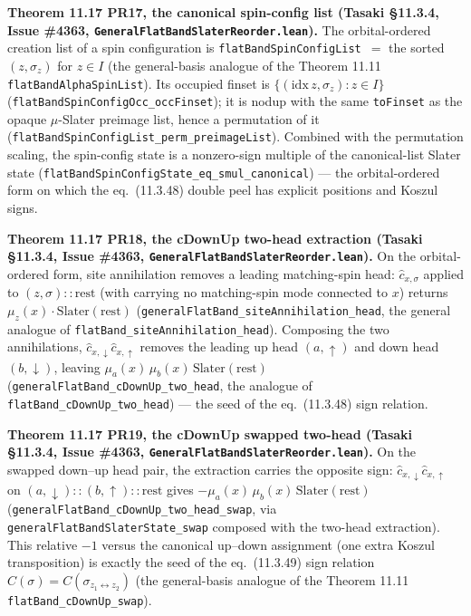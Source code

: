 \documentclass[a4paper,11pt]{article}
\begin{document}
\medskip\noindent\textbf{Theorem 11.17 PR17, the canonical spin-config list (Tasaki §11.3.4, Issue
\#4363, \texttt{GeneralFlatBandSlaterReorder.lean}).}  The orbital-ordered creation list of a spin
configuration is \texttt{flatBandSpinConfigList}~$=$ the sorted $(z,\sigma_z)$ for $z\in I$ (the
general-basis analogue of the Theorem 11.11 \texttt{flatBandAlphaSpinList}).  Its occupied finset is
$\{(\mathrm{idx}\,z,\sigma_z):z\in I\}$ (\texttt{flatBandSpinConfigOcc\_occFinset}); it is nodup with
the same \texttt{toFinset} as the opaque $\mu$-Slater preimage list, hence a permutation of it
(\texttt{flatBandSpinConfigList\_perm\_preimageList}).  Combined with the permutation scaling, the
spin-config state is a nonzero-sign multiple of the canonical-list Slater state
(\texttt{flatBandSpinConfigState\_eq\_smul\_canonical}) --- the orbital-ordered form on which the
eq.~(11.3.48) double peel has explicit positions and Koszul signs.

\medskip\noindent\textbf{Theorem 11.17 PR18, the cDownUp two-head extraction (Tasaki §11.3.4, Issue
\#4363, \texttt{GeneralFlatBandSlaterReorder.lean}).}  On the orbital-ordered form, site
annihilation removes a leading matching-spin head: $\hat c_{x,\sigma}$ applied to
$(z,\sigma)\!::\!\text{rest}$ (with  carrying no matching-spin mode connected to $x$)
returns $\mu_z(x)\cdot\text{Slater}(\text{rest})$ (\texttt{generalFlatBand\_siteAnnihilation\_head},
the general analogue of \texttt{flatBand\_siteAnnihilation\_head}).  Composing the two annihilations,
$\hat c_{x,\downarrow}\hat c_{x,\uparrow}$ removes the leading up head $(a,\uparrow)$ and down head
$(b,\downarrow)$, leaving $\mu_a(x)\,\mu_b(x)\,\text{Slater}(\text{rest})$
(\texttt{generalFlatBand\_cDownUp\_two\_head}, the analogue of \texttt{flatBand\_cDownUp\_two\_head})
--- the seed of the eq.~(11.3.48) sign relation.

\medskip\noindent\textbf{Theorem 11.17 PR19, the cDownUp swapped two-head (Tasaki §11.3.4, Issue
\#4363, \texttt{GeneralFlatBandSlaterReorder.lean}).}  On the swapped down--up head pair, the
extraction carries the opposite sign: $\hat c_{x,\downarrow}\hat c_{x,\uparrow}$ on
$(a,\downarrow)\!::\!(b,\uparrow)\!::\!\text{rest}$ gives
$-\mu_a(x)\,\mu_b(x)\,\text{Slater}(\text{rest})$ (\texttt{generalFlatBand\_cDownUp\_two\_head\_swap},
via \texttt{generalFlatBandSlaterState\_swap} composed with the two-head extraction).  This relative
$-1$ versus the canonical up--down assignment (one extra Koszul transposition) is exactly the seed of
the eq.~(11.3.49) sign relation $C(\sigma)=C(\sigma_{z_1\leftrightarrow z_2})$ (the general-basis
analogue of the Theorem 11.11 \texttt{flatBand\_cDownUp\_swap}).
\end{document}
